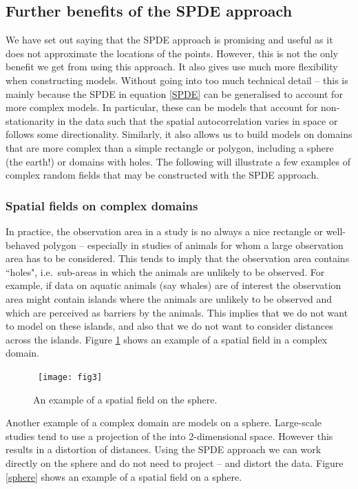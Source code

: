 \subsection{Further benefits of the SPDE approach}\label{benefit}
We have set out saying that the SPDE approach is promising and useful as it does not approximate the locations of the points. However, this is not the only benefit we get from using this approach. It also gives use much more flexibility when constructing models. Without going into too much technical detail -- this is mainly because the SPDE in equation \ref{SPDE} can be generalised to account for more complex models. In particular, these can be models that account for non-stationarity in the data such that the spatial autocorrelation varies in space or follows some directionality. Similarly, it also allows us to build models on domains that are more complex than a simple rectangle or polygon, including a sphere (the earth!) or domains with holes. The following will illustrate a few examples of complex random fields that may be constructed with the SPDE approach.

\subsubsection{Spatial fields on complex domains}
In practice, the observation area in a study is no always a nice rectangle or well-behaved polygon -- especially in studies of animals for whom a large observation area has to be considered. This tends to imply that the observation area contains ``holes", i.e.\ sub-areas in which the animals are unlikely to be observed.  For example, if data on aquatic animals (say whales) are of interest the observation area might contain islands where the animals are unlikely to be observed and which are perceived as barriers by the animals.  This implies that we do not want to model on these islands, and also that we do not want to consider distances across the islands. Figure \ref{complex} shows an example of a spatial field in a complex domain.
\begin{figure}[t]
  \centering
   \mbox{
\texttt{[image: fig3]}
}
\caption{An example of a spatial field on the sphere. \label{complex}}
\end{figure}

Another example of a complex domain are models on a sphere. Large-scale studies tend to use a projection of the into 2-dimensional space. However this results in a distortion of distances. Using the SPDE approach we can work directly on the sphere and do not need to project -- and distort the data. Figure \ref{sphere} shows an example of a spatial field on a sphere.

